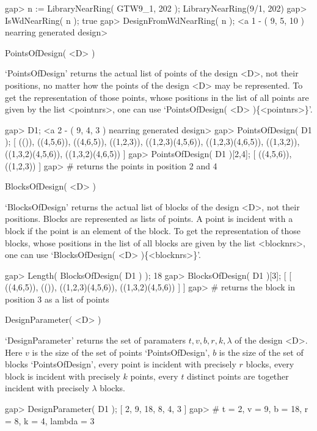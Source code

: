 \beginexample
    gap> n := LibraryNearRing( GTW9_1, 202 );
    LibraryNearRing(9/1, 202)
    gap> IsWdNearRing( n );
    true
    gap> DesignFromWdNearRing( n );
    <a 1 - ( 9, 5, 10 ) nearring generated design>
\endexample



\>PointsOfDesign( <D> )

`PointsOfDesign' returns the actual list of points of the design <D>, not
their positions, no matter how the points of the design <D> may be 
represented. To get the representation of those points, whose positions in 
the list of all points are given by the list <pointnrs>, one can use
`PointsOfDesign( <D> )\{<pointnrs>\}'.

\beginexample
    gap> D1;
    <a 2 - ( 9, 4, 3 ) nearring generated design>
    gap> PointsOfDesign( D1 );
    [ (()), ((4,5,6)), ((4,6,5)), ((1,2,3)), ((1,2,3)(4,5,6)), 
      ((1,2,3)(4,6,5)), ((1,3,2)), ((1,3,2)(4,5,6)), ((1,3,2)(4,6,5)) ]
    gap> PointsOfDesign( D1 ){[2,4]};
    [ ((4,5,6)), ((1,2,3)) ]
    gap> # returns the points in position 2 and 4 
\endexample

\>BlocksOfDesign( <D> )

`BlocksOfDesign' returns the actual list of blocks of the design <D>, not
their positions. Blocks are represented as lists of points. A point is 
incident with a block if the point is an element of the 
block. To get the representation of those blocks, whose positions in 
the list of all blocks are given by the list <blocknrs>, one can use
`BlocksOfDesign( <D> )\{<blocknrs>\}'.

\beginexample                              
    gap> Length( BlocksOfDesign( D1 ) );
    18
    gap> BlocksOfDesign( D1 ){[3]};
    [ [ ((4,6,5)), (()), ((1,2,3)(4,5,6)), ((1,3,2)(4,5,6)) ] ]
    gap> # returns the block in position 3 as a list of points
\endexample

\>DesignParameter( <D> )

`DesignParameter' returns the set of paramaters $t, v, b, r, k, \lambda$ 
of the design <D>. Here $v$ is the size of the set of points 
`PointsOfDesign', $b$ is the size of the set of blocks `PointsOfDesign',
every point is incident with precisely $r$ blocks, every block is incident 
with precisely $k$ points, every $t$ distinct points are together incident
with precisely $\lambda$ blocks. 

\beginexample
    gap> DesignParameter( D1 );
    [ 2, 9, 18, 8, 4, 3 ]
    gap> # t = 2, v = 9, b = 18, r = 8, k = 4, lambda = 3
\endexample

